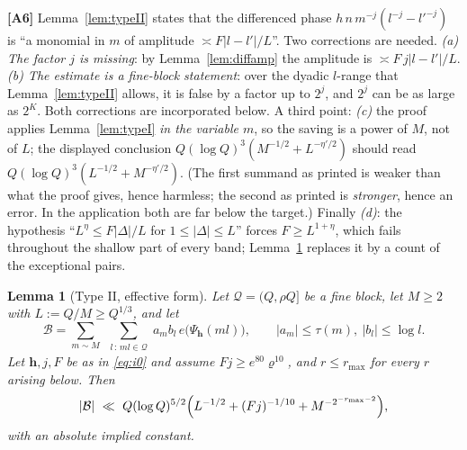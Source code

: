 \documentclass[11pt]{article}
\newtheorem{lemma}[theorem]{Lemma}
\theoremstyle{definition}
\theoremstyle{plain}
\begin{document}
\textbf{[A6]}  Lemma~\ref{lem:typeII} states that the differenced phase
$h\,n\,m^{-j}(l^{-j}-l'^{-j})$ is ``a monomial in $m$ of amplitude
$\asymp F|l-l'|/L$''.  Two corrections are needed.  \emph{(a) The factor
$j$ is missing}: by Lemma~\ref{lem:diffamp} the amplitude is
$\asymp F\,j|l-l'|/L$.  \emph{(b) The estimate is a fine-block
statement}: over the dyadic $l$-range that Lemma~\ref{lem:typeII}
allows, it is false by a factor up to $2^{j}$, and $2^{j}$ can be as
large as $2^{K}$.  Both corrections are incorporated below.  A third
point: \emph{(c)} the proof applies Lemma~\ref{lem:typeI} \emph{in the
variable $m$}, so the saving is a power of $M$, not of $L$; the displayed
conclusion $Q(\log Q)^{3}(M^{-1/2}+L^{-\eta'/2})$ should read
$Q(\log Q)^{3}(L^{-1/2}+M^{-\eta'/2})$.  (The first summand as printed is
weaker than what the proof gives, hence harmless; the second as printed
is \emph{stronger}, hence an error.  In the application both are far
below the target.)  Finally \emph{(d)}: the hypothesis
``$L^{\eta}\le F|\Delta|/L$ for $1\le|\Delta|\le L$'' forces
$F\ge L^{1+\eta}$, which fails throughout the shallow part of every band;
Lemma~\ref{lem:typeIIB} replaces it by a count of the exceptional pairs.

\begin{lemma}[Type II, effective form]\label{lem:typeIIB}
Let $\mathcal Q=(Q,\rho Q]$ be a fine block, let $M\ge2$ with
$L:=Q/M\ge Q^{1/3}$, and let
\[
\mathcal B=\sum_{m\sim M}\ \sum_{\substack{l\,:\,ml\in\mathcal Q}}
a_{m}b_{l}\,e\bigl(\Psi_{\mathbf h}(ml)\bigr),\qquad
|a_{m}|\le\tau(m),\ |b_{l}|\le\log l .
\]
Let $\mathbf h,j,F$ be as in \eqref{eq:i0} and assume
$Fj\ge e^{80}\varrho^{10}$, and $r\le r_{\max}$ for every $r$ arising
below.  Then
\[
|\mathcal B|\ \ll\ Q(\log Q)^{5/2}
\Bigl(L^{-1/2}+(Fj)^{-1/10}+M^{-2^{-r_{\max}-2}}\Bigr),
\]
with an absolute implied constant.
\end{lemma}
\end{document}
